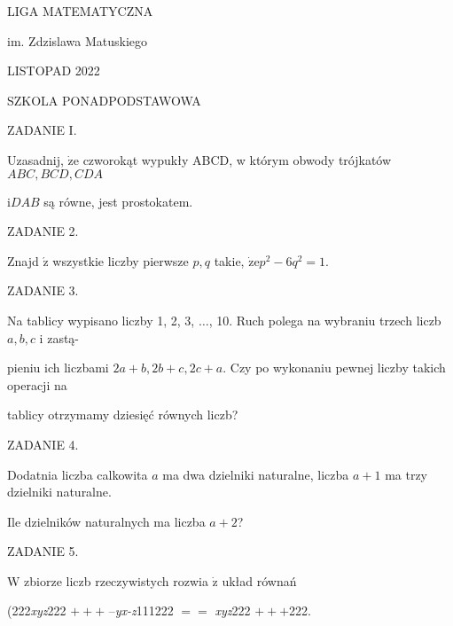 \documentclass[a4paper,12pt]{article}
\begin{document}
LIGA MATEMATYCZNA

im. Zdzislawa Matuskiego

LISTOPAD 2022

SZKOLA PONADPODSTAWOWA

ZADANIE I.

Uzasadnij, $\dot{\mathrm{z}}\mathrm{e}$ czworokąt wypukły ABCD, w którym obwody trójkatów $ABC, BCD, CDA$

$\mathrm{i}DAB$ są równe, jest prostokatem.

ZADANIE 2.

Znajd $\acute{\mathrm{z}}$ wszystkie liczby pierwsze $p, q$ takie, $\dot{\mathrm{z}}\mathrm{e}p^{2}-6q^{2}=1.$

ZADANIE 3.

Na tablicy wypisano liczby 1, 2, 3, $\ldots$, 10. Ruch polega na wybraniu trzech liczb $a, b, c$ i zastą-

pieniu ich liczbami $2a+b, 2b+c, 2c+a$. Czy po wykonaniu pewnej liczby takich operacji na

tablicy otrzymamy dziesięć równych liczb?

ZADANIE 4.

Dodatnia liczba calkowita $a$ ma dwa dzielniki naturalne, liczba $a+1$ ma trzy dzielniki naturalne.

Ile dzielników naturalnych ma liczba $a+2$?

ZADANIE 5.

$\mathrm{W}$ zbiorze liczb rzeczywistych rozwia $\dot{\mathrm{z}}$ układ równań

(222{\it xyz}222 $+++$ --{\it yx-z}111222 $==$ {\it xyz}222 $+++$222.
\end{document}
